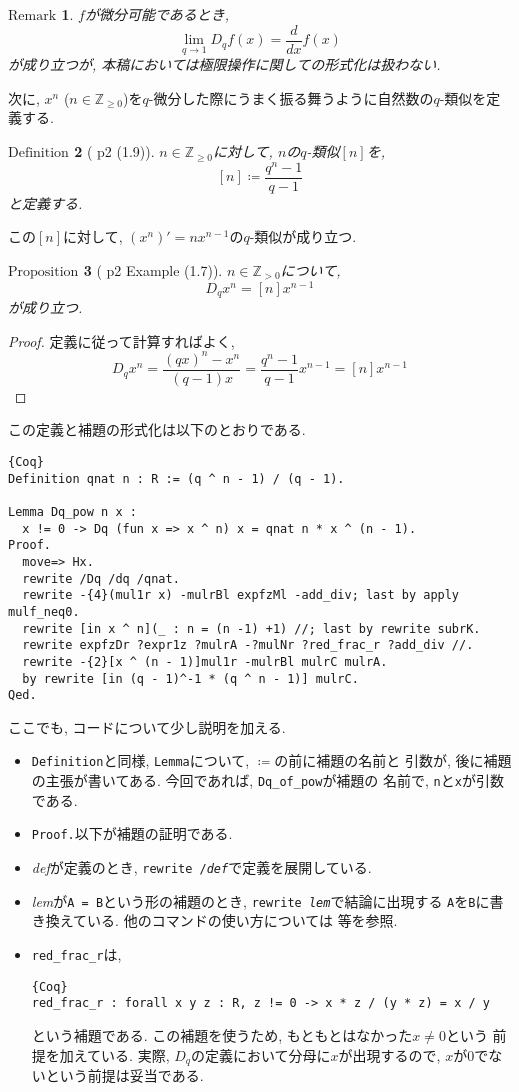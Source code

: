 \documentclass[11pt]{jarticle}
\theoremstyle{mystyle}
\newtheorem{df}{$\textrm{Definition}$}[subsubsection]
\newtheorem{prop}[df]{$\textrm{Proposition}$}
\newtheorem{rmk}[df]{$\textrm{Remark}$}
\newcommand{\bdf}{\begin{shadebox} \begin{df}}
\newcommand{\edf}{\end{df} \end{shadebox}}
\newcommand{\bprop}{\begin{shadebox} \begin{prop}}
\newcommand{\eprop}{\end{prop} \end{shadebox}}
\newcommand{\brmk}{\begin{rmk}}
\newcommand{\ermk}{\end{rmk}}
\newcommand{\bpf}{\begin{proof}}
\newcommand{\epf}{\end{proof}}
\newcommand{\Z}{\mathbb{Z}}
\newcommand{\ra}{\rightarrow}
\newcommand{\0}{\textbf{0}}
\newcommand{\1}{\textbf{1}}
\newcommand{\2}{\textbf{2}}
\begin{document}
\brmk
  $f$が微分可能であるとき, 
  \[
    \lim_{q\ra1} D_qf(x) = \frac{d}{dx}f(x)
  \] 
  が成り立つが, 本稿においては極限操作に関しての形式化は扱わない. 
\ermk
次に, $x ^ n$ ($n \in \Z_{\ge 0}$)を$q$-微分した際にうまく振る舞うように自然数の$q$-類似を定義する. 
\bdf[\cite{Kac} p2 (1.9)]
  $n \in \Z_{\ge 0}$に対して, $n$の$q$-類似$[n]$を, 
  \[
    [n] \coloneqq \frac{q^n - 1}{q - 1}
  \]
  と定義する. 
\edf
この$[n]$に対して, $(x^n)' = n x^{n-1}$の$q$-類似が成り立つ.
\bprop[\cite{Kac} p2 Example (1.7)]
  $n \in \Z_{>0}$について, 
  \[
    D_q x^n = [n] x ^{n - 1}
  \]
  が成り立つ. 
\eprop
\bpf
  定義に従って計算すればよく, 
  \[
    D_q x ^ n = \frac{(qx) ^ n - x ^ n}{(q - 1) x}
                 = \frac{q^n - 1}{q - 1} x ^ {n - 1}
                 = [n] x ^ {n - 1}
  \] 
\epf
この定義と補題の形式化は以下のとおりである. 
\begin{lstlisting}{Coq}
Definition qnat n : R := (q ^ n - 1) / (q - 1).

Lemma Dq_pow n x :
  x != 0 -> Dq (fun x => x ^ n) x = qnat n * x ^ (n - 1).
Proof.
  move=> Hx.
  rewrite /Dq /dq /qnat.
  rewrite -{4}(mul1r x) -mulrBl expfzMl -add_div; last by apply mulf_neq0.
  rewrite [in x ^ n](_ : n = (n -1) +1) //; last by rewrite subrK.
  rewrite expfzDr ?expr1z ?mulrA -?mulNr ?red_frac_r ?add_div //.
  rewrite -{2}[x ^ (n - 1)]mul1r -mulrBl mulrC mulrA.
  by rewrite [in (q - 1)^-1 * (q ^ n - 1)] mulrC.
Qed.
\end{lstlisting}
ここでも, コードについて少し説明を加える. 
\begin{itemize}
  \item {\tt Definition}と同様, {\tt Lemma}について, {\tt $\coloneqq$}の前に補題の名前と
          引数が, 後に補題の主張が書いてある. 今回であれば, {\tt Dq\_of\_pow}が補題の
          名前で, {\tt n}と{\tt x}が引数である. 
  \item {\tt Proof.}以下が補題の証明である. 
  \item {\it def}が定義のとき, {\tt rewrite /{\it def}}で定義を展開している. 
  \item {\it lem}が{\tt A = B}という形の補題のとき, {\tt rewrite {\it lem}}で結論に出現する
          {\tt A}を{\tt B}に書き換えている. 他のコマンドの使い方については \cite{Hag}等を参照. 
  \item {\tt red\_frac\_r}は, 
           \begin{lstlisting}{Coq}
red_frac_r : forall x y z : R, z != 0 -> x * z / (y * z) = x / y \end{lstlisting}
           という補題である. この補題を使うため, もともとはなかった{\tt $x \ne 0$}という
           前提を加えている. 実際, $D_q$の定義において分母に$x$が出現するので, 
           $x$が$0$でないという前提は妥当である.  
\end{itemize}
\end{document}

